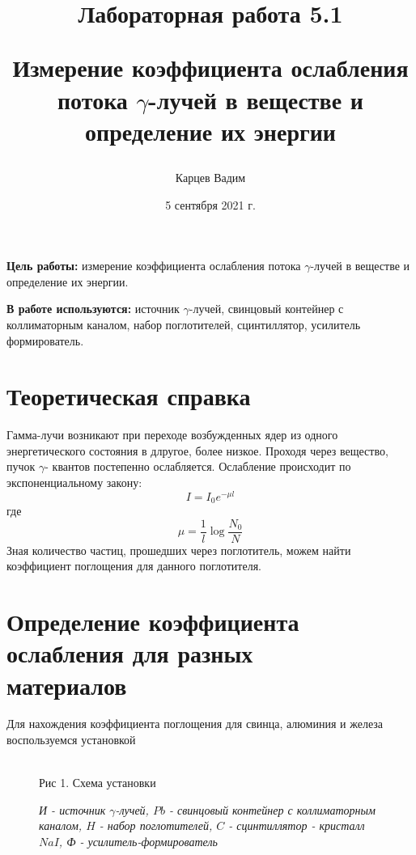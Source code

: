 \documentclass[12pt]{article}
\date{5 сентября 2021 г.}
\author{Карцев Вадим}
\title{Лабораторная работа 5.1

Измерение коэффициента ослабления потока $\gamma$-лучей в веществе и
определение их энергии}
\begin{document}
\maketitle

\textbf{Цель работы:} измерение коэффициента ослабления потока $\gamma$-лучей
в веществе и определение их энергии.

\vspace{0.3cm}

\textbf{В работе используются:} источник $\gamma$-лучей, свинцовый контейнер с
коллиматорным каналом, набор поглотителей, сцинтиллятор, усилитель
формирователь.

\vspace{1.5cm}

\section{Теоретическая справка}

  Гамма-лучи возникают при переходе возбужденных ядер из одного энергетического
  состояния в длругое, более низкое. Проходя через вещество, пучок $\gamma$-
  квантов постепенно ослабляется. Ослабление происходит по экспоненциальному
  закону:
  $$I = I_0e^{-\mu l}$$ где $$\mu = \frac{1}{l}\log{\frac{N_0}{N}}$$
  Зная количество частиц, прошедших через поглотитель, можем найти коэффициент
  поглощения для данного поглотителя.

\newpage

\section{Определение коэффициента ослабления для разных \\материалов}

  Для нахождения коэффициента поглощения для свинца, алюминия и железа
  воспользуемся установкой
  \begin {figure}[h!]
    \begin{minipage}[h]{0.99\linewidth}
        \\
        Рис 1. Схема установки

        \textit{И - источник $\gamma$-лучей, $Pb$ - свинцовый контейнер с
        коллиматорным каналом, $H$ - набор поглотителей, $C$ - сцинтиллятор -
        кристалл $NaI$, Ф - усилитель-формирователь}
    \end{minipage}
    \label {fig:image1}
  \end {figure}
\end{document}
